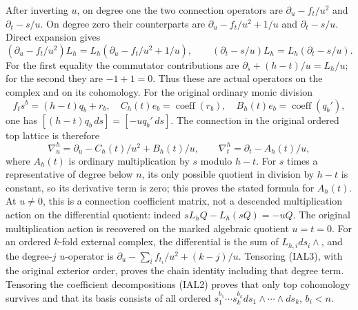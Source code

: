 \documentclass[11pt,a4paper]{article}
\theoremstyle{definition}
\begin{document}
After inverting $u$, on degree one the two connection operators are
$\partial_u-f_t/u^2$ and $\partial_t-s/u$.  On degree zero their
counterparts are $\partial_u-f_t/u^2+1/u$ and $\partial_t-s/u$.
Direct expansion gives
\begin{equation}
 (\partial_u-f_t/u^2)L_h=L_h(\partial_u-f_t/u^2+1/u),
 \qquad (\partial_t-s/u)L_h=L_h(\partial_t-s/u).
                                                        \tag{IAL3}
\end{equation}
For the first equality the commutator contributions are
$\partial_s+(h-t)/u=L_h/u$; for the second they are $-1+1=0$.
Thus these are actual operators on the complex and on its cohomology.
For the original ordinary monic division
\begin{equation}
 f_t s^b=(h-t)q_b+r_b,\quad
 C_h(t)e_b=\operatorname{coeff}(r_b),\quad
 B_h(t)e_b=\operatorname{coeff}(q_b'),                 \tag{IAL4}
\end{equation}
one has $[(h-t)q_b\,ds]=[-u q_b'\,ds]$.  The connection in the original
ordered top lattice is therefore
\begin{equation}
 \nabla_u^h=\partial_u-C_h(t)/u^2+B_h(t)/u,
 \qquad \nabla_t^h=\partial_t-A_h(t)/u,                \tag{IAL5}
\end{equation}
where $A_h(t)$ is ordinary multiplication by $s$ modulo $h-t$.
For $s$ times a representative of degree below $n$, its only possible
quotient in division by $h-t$ is constant, so its derivative term is zero;
this proves the stated formula for $A_h(t)$.
At $u\ne0$, this is a connection coefficient matrix, not a descended
multiplication action on the differential quotient: indeed
$sL_hQ-L_h(sQ)=-uQ$.  The original multiplication action is recovered
on the marked algebraic quotient $u=t=0$.
For an ordered $k$-fold external complex, the differential is the sum
of $L_{h,i}ds_i\wedge$, and the degree-$j$ $u$-operator is
$\partial_u-\sum_i f_{t_i}/u^2+(k-j)/u$.  Tensoring (IAL3), with the
original exterior order, proves the chain identity including that degree
term.  Tensoring the coefficient decompositions (IAL2) proves that only
top cohomology survives and that its basis consists of all ordered
$s_1^{b_1}\cdots s_k^{b_k}ds_1\wedge\cdots\wedge ds_k$, $b_i<n$.
\end{document}
